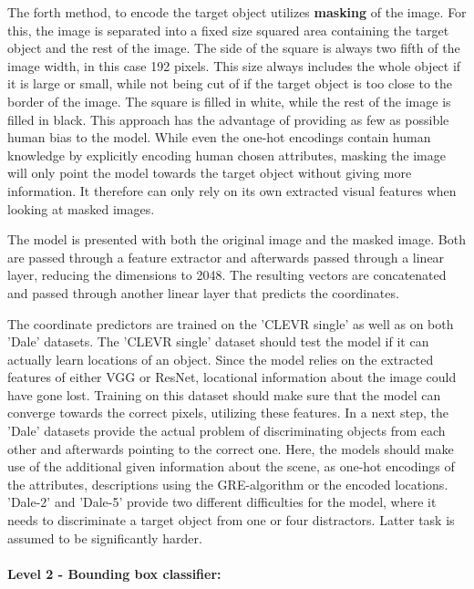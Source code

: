 The forth method, to encode the target object utilizes \textbf{masking} of the image.
For this, the image is separated into a fixed size squared area containing the target object and the rest of the image.
The side of the square is always two fifth of the image width, in this case 192 pixels.
This size always includes the whole object if it is large or small, while not being cut of if the target object is too close to the border of the image.
The square is filled in white, while the rest of the image is filled in black.
This approach has the advantage of providing as few as possible human bias to the model.
While even the one-hot encodings contain human knowledge by explicitly encoding human chosen attributes, masking the image will only point the model towards the target object without giving more information.
It therefore can only rely on its own extracted visual features when looking at masked images.

The model is presented with both the original image and the masked image.
Both are passed through a feature extractor and afterwards passed through a linear layer, reducing the dimensions to 2048.
The resulting vectors are concatenated and passed through another linear layer that predicts the coordinates.


The coordinate predictors are trained on the 'CLEVR single' as well as on both 'Dale' datasets.
The 'CLEVR single' dataset should test the model if it can actually learn locations of an object.
Since the model relies on the extracted features of either VGG or ResNet, locational information about the image could have gone lost.
Training on this dataset should make sure that the model can converge towards the correct pixels, utilizing these features.
In a next step, the 'Dale' datasets provide the actual problem of discriminating objects from each other and afterwards pointing to the correct one.
Here, the models should make use of the additional given information about the scene, as one-hot encodings of the attributes, descriptions using the GRE-algorithm or the encoded locations.
'Dale-2' and 'Dale-5' provide two different difficulties for the model, where it needs to discriminate a target object from one or four distractors.
Latter task is assumed to be significantly harder.

\paragraph{Level 2 - Bounding box classifier:}

